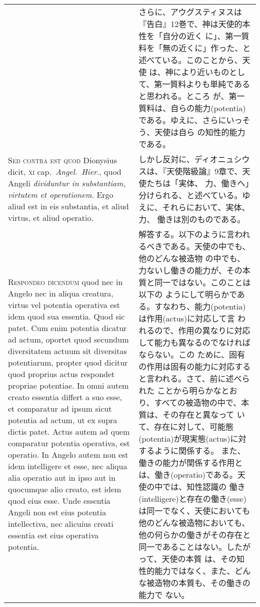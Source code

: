 \documentclass[10pt]{jsarticle} %
\begin{document}
\begin{longtable}{p{21em}p{21em}}
&
さらに、アウグスティヌスは『告白』12巻で、神は天使的本性を「自分の近く
 に」、第一質料を「無の近くに」作った、と述べている。このことから、天使
 は、神により近いものとして、第一質料よりも単純であると思われる。ところ
 が、第一質料は、自らの能力(potentia)である。ゆえに、さらにいっそう、天使は自ら
 の知性的能力である。

\\


{\scshape  Sed contra est quod} Dionysius dicit, {\scshape xi}
cap.~{\itshape Angel.~Hier}., quod Angeli {\itshape dividuntur in substantiam, virtutem et
operationem}. Ergo aliud est in eis substantia, et aliud virtus, et aliud
operatio.

&
しかし反対に、ディオニュシウスは、『天使階級論』9章で、天使たちは「実体、
 力、働きへ」分けられる、と述べている。ゆえに、それらにおいて、実体、力、
 働きは別のものである。

\\


{\scshape Respondeo dicendum} quod nec in Angelo nec in
aliqua creatura, virtus vel potentia operativa est idem quod sua
essentia. Quod sic patet. Cum enim potentia dicatur ad actum, oportet
quod secundum diversitatem actuum sit diversitas potentiarum, propter
quod dicitur quod proprius actus respondet propriae potentiae. In omni
autem creato essentia differt a suo esse, et comparatur ad ipsum sicut
potentia ad actum, ut ex supra dictis patet. Actus autem ad quem
comparatur potentia operativa, est operatio. In Angelo autem non est
idem intelligere et esse, nec aliqua alia operatio aut in ipso aut in
quocumque alio creato, est idem quod eius esse. Unde essentia Angeli non
est eius potentia intellectiva, nec alicuius creati essentia est eius
operativa potentia.

&

解答する。以下のように言われるべきである。天使の中でも、他のどんな被造物
の中でも、力ないし働きの能力が、その本質と同一ではない。このことは以下の
ようにして明らかである。すなわち、能力(potentia)は作用(actus)に対応して言
われるので、作用の異なりに対応して能力も異なるのでなければならない。この
ために、固有の作用は固有の能力に対応すると言われる。さて、前に述べられた
ことから明らかなとおり、すべての被造物の中で、本質は、その存在と異なって
いて、存在に対して、可能態(potentia)が現実態(actus)に対するように関係する。
また、働きの能力が関係する作用とは、働き(operatio)である。天使の中では、知性認識の
働き(intelligere)と存在の働き(esse)は同一でなく、天使においても他のどんな被造物においても、
他の何らかの働きがその存在と同一であることはない。したがって、天使の本質
は、その知性的能力ではなく、また、どんな被造物の本質も、その働きの能力で
ない。


\end{longtable}
\end{document}
